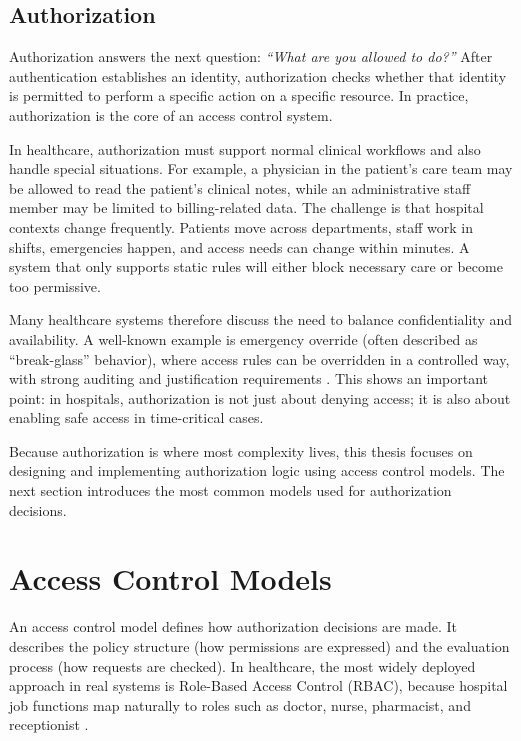 \subsection{Authorization}
\label{subsec:authorization}

Authorization answers the next question: \textit{“What are you allowed to do?”} After authentication establishes an identity, authorization checks whether that identity is permitted to perform a specific action on a specific resource. In practice, authorization is the core of an access control system.

In healthcare, authorization must support normal clinical workflows and also handle special situations. For example, a physician in the patient’s care team may be allowed to read the patient’s clinical notes, while an administrative staff member may be limited to billing-related data. The challenge is that hospital contexts change frequently. Patients move across departments, staff work in shifts, emergencies happen, and access needs can change within minutes. A system that only supports static rules will either block necessary care or become too permissive.
\vspace{0.5cm}


Many healthcare systems therefore discuss the need to balance confidentiality and availability. A well-known example is emergency override (often described as “break-glass” behavior), where access rules can be overridden in a controlled way, with strong auditing and justification requirements \cite{SantosPereira2013}. This shows an important point: in hospitals, authorization is not just about denying access; it is also about enabling safe access in time-critical cases.
\vspace{0.5cm}


Because authorization is where most complexity lives, this thesis focuses on designing and implementing authorization logic using access control models. The next section introduces the most common models used for authorization decisions.

\section{Access Control Models}
\label{sec:ac-models}

An access control model defines how authorization decisions are made. It describes the policy structure (how permissions are expressed) and the evaluation process (how requests are checked). In healthcare, the most widely deployed approach in real systems is Role-Based Access Control (RBAC), because hospital job functions map naturally to roles such as doctor, nurse, pharmacist, and receptionist \cite{SantosPereira2013}.
\vspace{0.5cm}


